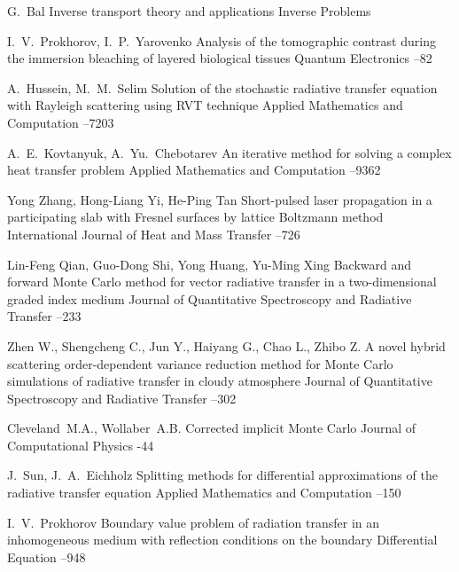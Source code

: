 \documentclass[12pt,reqno]{report}
\begin{document}
{\begin{thebibliography}{1}
\by G.~Bal \paper Inverse transport theory and applications
\jour Inverse Problems     


\by I.~V.~Prokhorov, I.~P.~Yarovenko
\paper Analysis of the tomographic contrast during the immersion bleaching of layered biological tissues
\jour Quantum Electronics
--82

\by
A.~Hussein, M.~M.~Selim
\paper Solution of the stochastic radiative transfer equation with Rayleigh scattering using RVT technique \jour 
Applied Mathematics and Computation     --7203


\by A.~E.~Kovtanyuk, A.~Yu.~Chebotarev
\paper An iterative method for solving a complex heat transfer problem
\jour Applied Mathematics and Computation    --9362


 \by Yong Zhang, Hong-Liang Yi, He-Ping Tan  \paper Short-pulsed laser propagation in a participating slab with Fresnel
surfaces by lattice Boltzmann method \jour International Journal of Heat and Mass Transfer   --726


 \by Lin-Feng Qian, Guo-Dong Shi, Yong Huang, Yu-Ming Xing \paper Backward and forward Monte Carlo method for vector radiative transfer in a two-dimensional graded index medium \jour Journal of Quantitative Spectroscopy and Radiative Transfer   --233

 \by Zhen W., Shengcheng C., Jun Y., Haiyang G., Chao L., Zhibo Z.
\paper A novel hybrid scattering order-dependent variance
reduction method for Monte Carlo simulations of radiative transfer
in cloudy atmosphere \jour Journal of Quantitative Spectroscopy
and Radiative Transfer   --302


 \by  Cleveland~M.A., Wollaber~A.B. \paper 
Corrected implicit Monte Carlo 
\jour Journal of Computational Physics   -44



\by
J.~Sun,  J.~A.~Eichholz 
\paper Splitting methods for differential approximations of the radiative transfer equation  \jour 
Applied Mathematics and Computation    --150




 \by   I.~V.~Prokhorov \paper Boundary value problem of radiation transfer in an inhomogeneous medium with reflection conditions on the boundary
\jour Differential  Equation
--948




\end{thebibliography}}
\end{document}
